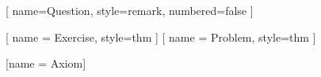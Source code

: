[
    name=Question,
    style=remark,
    numbered=false
]

[
    name = Exercise,
    style=thm
]
[
    name = Problem,
    style=thm
]

[name = Axiom]


\usepackage{tikz}
\usepackage{tikz-cd}
\usepackage{float}
\usepackage{wasysym}
\usepackage{hyperref}
\usepackage[normalem]{ulem}
\usepackage{pgfplots}
\usetikzlibrary{patterns}
\usetikzlibrary{positioning,arrows.meta}
\usetikzlibrary{decorations.pathreplacing}
\usetikzlibrary{patterns}
\pgfplotsset{compat=1.18}
\usepackage{etoolbox}
\usepackage{bm}
\usepackage{enumitem}
